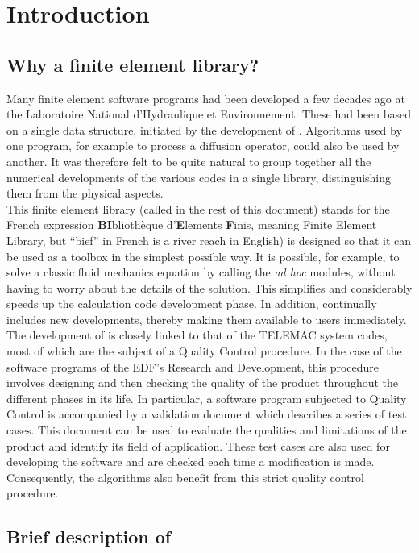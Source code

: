 %
%
\chapter{Introduction}
%
%
%
\section{Why a finite element library?}
%
Many finite element software programs had been developed a few decades ago
at the Laboratoire National d'Hydraulique et Environnement. These
had been based on a single data structure, initiated by the development of
. Algorithms used by one program, for example to process a diffusion
operator, could also be used by another. It was therefore felt to be quite
natural to group together all the numerical developments of the various codes
in a single library, distinguishing them from the physical aspects.
\\
This finite element library (called \bief in the rest of this document)
stands for the French expression \textbf{BI}blioth\`{e}que d'\textbf{E}lements
\textbf{F}inis, meaning Finite Element Library, but ``bief'' in French is a
river reach in English) is designed so that it can be used as a toolbox in the
simplest possible way. It is possible, for example, to solve a classic fluid
mechanics equation by calling the \bief \textit{ad hoc} modules, without having
to worry about the details of the solution. This simplifies and considerably
speeds up the calculation code development phase. In addition, \bief continually
includes new developments, thereby making them available to users immediately.
\\
The development of \bief is closely linked to that of the TELEMAC system codes,
most of which are the subject of a Quality Control procedure. In the case of
the software programs of the EDF's Research and Development, this procedure
involves designing and then checking the quality of the product throughout the
different phases in its life. In particular, a software program subjected to
Quality Control is accompanied by a validation document which describes a
series of test cases. This document can be used to evaluate the qualities and
limitations of the product and identify its field of application. These test
cases are also used for developing the software and are checked each time a
modification is made. Consequently, the \bief algorithms also benefit from this
strict quality control procedure.
%
\section{Brief description of \bief}

